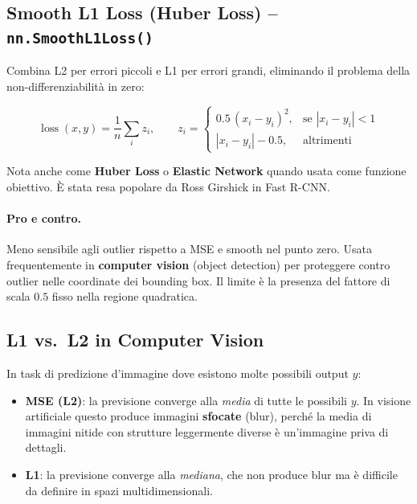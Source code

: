 \subsection{Smooth L1 Loss (Huber Loss) -- \texttt{nn.SmoothL1Loss()}}
\label{subsec:smooth-l1}

Combina L2 per errori piccoli e L1 per errori grandi, eliminando il problema
della non-differenziabilità in zero:

\begin{equation}
  \operatorname{loss}(x, y) = \frac{1}{n}\sum_i z_i, \qquad
  z_i =
  \begin{cases}
    0.5\,(x_i - y_i)^2,   & \text{se } |x_i - y_i| < 1 \\
    |x_i - y_i| - 0.5,    & \text{altrimenti}
  \end{cases}
\end{equation}

Nota anche come \textbf{Huber Loss} o \textbf{Elastic Network} quando usata come
funzione obiettivo. È stata resa popolare da Ross Girshick in Fast R-CNN.

\paragraph{Pro e contro.}
Meno sensibile agli outlier rispetto a MSE e smooth nel punto zero.
Usata frequentemente in \textbf{computer vision} (object detection) per
proteggere contro outlier nelle coordinate dei bounding box.
Il limite è la presenza del fattore di scala $0.5$ fisso nella regione quadratica.

\subsection{L1 vs.\ L2 in Computer Vision}
\label{subsec:l1-l2-cv}

In task di predizione d'immagine dove esistono molte possibili output $y$:

\begin{itemize}
  \item \textbf{MSE (L2)}: la previsione converge alla \textit{media} di tutte
        le possibili $y$. In visione artificiale questo produce immagini
        \textbf{sfocate} (blur), perché la media di immagini nitide con
        strutture leggermente diverse è un'immagine priva di dettagli.
  \item \textbf{L1}: la previsione converge alla \textit{mediana}, che non
        produce blur ma è difficile da definire in spazi multidimensionali.
\end{itemize}

